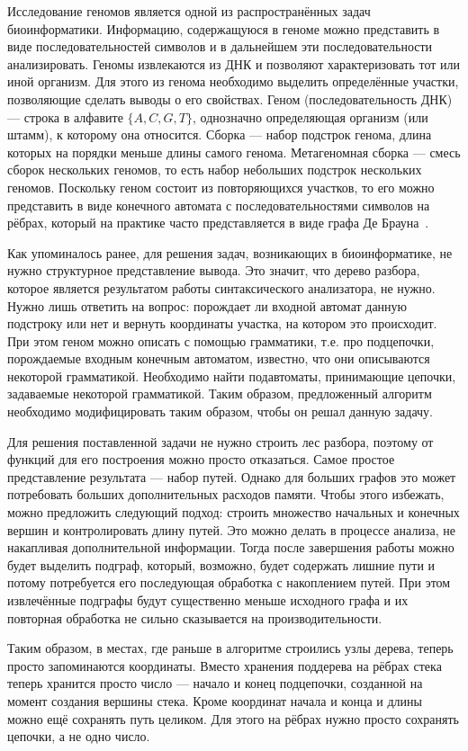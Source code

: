 Исследование геномов является одной из распространённых задач биоинформатики. Информацию, содержащуюся в геноме можно представить в виде последовательностей символов и в дальнейшем эти последовательности анализировать. Геномы извлекаются из ДНК и позволяют характеризовать тот или иной организм. Для этого из генома необходимо выделить определённые участки, позволяющие сделать выводы о его свойствах. Геном (последовательность ДНК) --- строка в алфавите $\{A, C, G, T\}$, однозначно определяющая организм (или штамм), к которому она относится. Сборка --- набор подстрок генома, длина которых на порядки меньше длины самого генома. Метагеномная сборка --- смесь сборок нескольких геномов, то есть набор небольших подстрок нескольких геномов. Поскольку геном состоит из повторяющихся участков, то его можно представить в виде конечного автомата с последовательностями символов на рёбрах, который на практике часто представляется в виде графа  Де Брауна~\cite{Bruijn}.

Как упоминалось ранее, для решения задач, возникающих в биоинформатике, не нужно структурное представление вывода. Это значит, что дерево разбора, которое является результатом работы синтаксического анализатора, не нужно. Нужно лишь ответить на вопрос: порождает ли входной автомат данную подстроку или нет и вернуть координаты участка, на котором это происходит. При этом геном можно описать с помощью грамматики, т.е. про подцепочки, порождаемые входным конечным автоматом, известно, что они описываются некоторой грамматикой. Необходимо найти подавтоматы, принимающие цепочки, задаваемые некоторой грамматикой. Таким образом, предложенный алгоритм необходимо модифицировать таким образом, чтобы он решал данную задачу. 

Для решения поставленной задачи не нужно строить лес разбора, поэтому от функций для его построения можно просто отказаться. Самое простое представление результата --- набор путей. Однако для больших графов это может потребовать больших дополнительных расходов памяти. Чтобы этого избежать, можно предложить следующий подход: строить множество начальных и конечных вершин и контролировать длину путей. Это можно делать в процессе анализа, не накапливая дополнительной информации. Тогда после завершения работы можно будет выделить подграф, который, возможно, будет содержать лишние пути и потому потребуется его последующая обработка с накоплением путей. При этом извлечённые подграфы будут существенно меньше исходного графа и их повторная обработка не сильно сказывается на производительности.

Таким образом, в местах, где раньше в алгоритме строились узлы дерева, теперь просто запоминаются координаты. Вместо хранения поддерева на рёбрах стека теперь хранится просто число --- начало и конец подцепочки, созданной на момент создания вершины стека. Кроме координат начала и конца и длины можно ещё сохранять путь целиком. Для этого на рёбрах нужно просто сохранять цепочки, а не одно число. 
